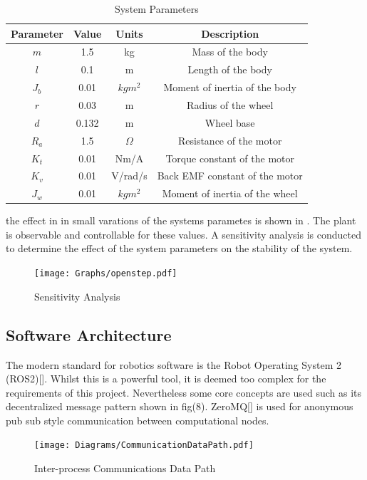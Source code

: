         \begin{table} [H]
            \centering
            \begin{tabular}{|c|c|c|c|}
                \hline
                Parameter & Value & Units & Description \\
                \hline
                $m$ & 1.5 & kg & Mass of the body \\
                $l$ & 0.1 & m & Length of the body \\
                $J_b$ & 0.01 & $kgm^2$ & Moment of inertia of the body \\
                $r$ & 0.03 & m & Radius of the wheel \\
                $d$ & 0.132 & m & Wheel base \\
                $R_a$ & 1.5 & $\Omega$ & Resistance of the motor \\
                $K_t$ & 0.01 & Nm/A & Torque constant of the motor \\
                $K_v$ & 0.01 & V/rad/s & Back EMF constant of the motor \\
                $J_w$ & 0.01 & $kgm^2$ & Moment of inertia of the wheel \\
                \hline
            \end{tabular}
            \caption{System Parameters}
        \end{table}


        the effect in in small varations of the systems parametes is 
        shown in . The plant is observable and controllable for these values.
        A sensitivity analysis is conducted to determine the effect of the system parameters on the
        stability of the system.
        \begin{figure}[H]
            \centering
            \texttt{[image: Graphs/openstep.pdf]}
            \caption{Sensitivity Analysis}
            \label{fig:paramuncertitny} 
        \end{figure}

        \pagebreak{}
        \subsection{Software Architecture}
        The modern standard for robotics software is the Robot Operating System 2 (ROS2)[]. 
        Whilst this is a powerful tool, it is deemed too complex for the requirements of this project.
        Nevertheless some core concepts are used such as its 
        decentralized message pattern shown in fig(8). ZeroMQ[] is used for 
        anonymous pub sub style communication between computational nodes.
        \begin{figure} [H]
            \texttt{[image: Diagrams/CommunicationDataPath.pdf]}  
            \caption{Inter-process Communications Data Path}
        \end{figure}

